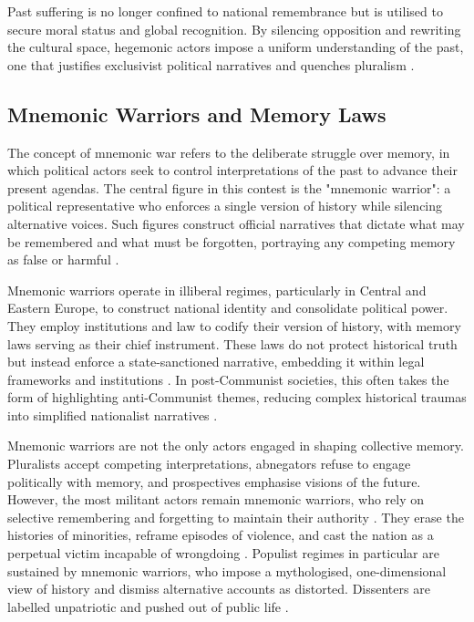 Past suffering is no longer confined to national remembrance but is utilised to secure moral status and global recognition. By silencing opposition and rewriting the cultural space, hegemonic actors impose a uniform understanding of the past, one that justifies exclusivist political narratives and quenches pluralism \citep{assmann_transnational_2014}.


\subsection{Mnemonic Warriors and Memory Laws}
\label{sec:mnemonic_warriors_and_memory_laws}

The concept of mnemonic war refers to the deliberate struggle over memory, in which political actors seek to control interpretations of the past to advance their present agendas. The central figure in this contest is the "mnemonic warrior": a political representative who enforces a single version of history while silencing alternative voices. Such figures construct official narratives that dictate what may be remembered and what must be forgotten, portraying any competing memory as false or harmful \citep{bernhard_notitle_2014}.

Mnemonic warriors operate in illiberal regimes, particularly in Central and Eastern Europe, to construct national identity and consolidate political power. They employ institutions and law to codify their version of history, with memory laws serving as their chief instrument. These laws do not protect historical truth but instead enforce a state-sanctioned narrative, embedding it within legal frameworks and institutions \citep{gliszczynska_grabias_memory_2014}. In post-Communist societies, this often takes the form of highlighting anti-Communist themes, reducing complex historical traumas into simplified nationalist narratives \citep{grabowski_memory_2018}.

Mnemonic warriors are not the only actors engaged in shaping collective memory. Pluralists accept competing interpretations, abnegators refuse to engage politically with memory, and prospectives emphasise visions of the future. However, the most militant actors remain mnemonic warriors, who rely on selective remembering and forgetting to maintain their authority \citep{bernhard_notitle_2014}. They erase the histories of minorities, reframe episodes of violence, and cast the nation as a perpetual victim incapable of wrongdoing \citep{woycicka_mnemonic_2024}. Populist regimes in particular are sustained by mnemonic warriors, who impose a mythologised, one-dimensional view of history and dismiss alternative accounts as distorted. Dissenters are labelled unpatriotic and pushed out of public life \citep{pozarlik_momentarily_2022}.

